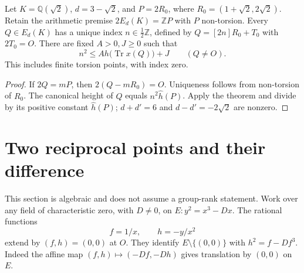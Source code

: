 \documentclass[11pt,a4paper]{article}
\newcommand{\Q}{\mathbb Q}\newcommand{\Z}{\mathbb Z}\DeclareMathOperator{\Tr}{Tr}
\begin{document}
\begin{corollary}\label{cor:index}
Let $K=\Q(\sqrt2)$, $d=3-\sqrt2$, and $P=2R_0$, where
$R_0=(1+\sqrt2,2\sqrt2)$. Retain the arithmetic premise
$2E_d(K)=\Z P$ with $P$ non-torsion. Every $Q\in E_d(K)$ has a unique
index $n\in\tfrac12\Z$, defined by $Q=[2n]R_0+T_0$ with $2T_0=O$.
There are fixed $A>0,J\ge0$ such that
\[
 n^2\le A h\bigl(\Tr x(Q)\bigr)+J\qquad(Q\ne O).
\]
This includes finite torsion points, with index zero.
\end{corollary}
\begin{proof}
If $2Q=mP$, then $2(Q-mR_0)=O$. Uniqueness follows from
non-torsion of $R_0$. The canonical height of $Q$ equals
$n^2\widehat h(P)$. Apply the theorem and divide by its positive
constant $\widehat h(P)$; $d+d'=6$ and $d-d'=-2\sqrt2$ are nonzero.
\end{proof}

\section{Two reciprocal points and their difference}
This section is algebraic and does not assume a group-rank statement.
Work over any field of characteristic zero, with $D\ne0$, on
$E:y^2=x^3-Dx$. The rational functions
\[
          f=1/x,
          \qquad h=-y/x^2
\]
extend by $(f,h)=(0,0)$ at $O$. They identify
$E\setminus\{(0,0)\}$ with $h^2=f-Df^3$. Indeed the affine map
$(f,h)\mapsto(-Df,-Dh)$ gives translation by $(0,0)$ on $E$.
\end{document}
